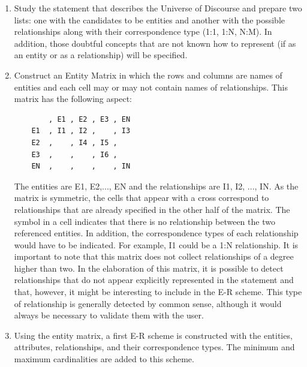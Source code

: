\documentclass{article}
\numberwithin{figure}{section}
\begin{document}
\begin{enumerate}
    \item Study the statement that describes the Universe of Discourse and prepare two lists: one with the candidates to be entities and another with the possible relationships along with their correspondence type (1:1, 1:N, N:M).  In addition, those doubtful concepts that are not known how to represent (if as an entity or as a relationship) will be specified.
    \item Construct an Entity Matrix in which the rows and columns are names of entities and each cell may or may not contain names of relationships.  This matrix has the following aspect:

    \begin{verbatim}
        , E1 , E2 , E3 , EN
    E1  , I1 , I2 ,    , I3
    E2  ,    , I4 , I5 ,
    E3  ,    ,    , I6 ,
    EN  ,    ,    ,    , IN
    \end{verbatim}

    The entities are E1, E2,..., EN and the relationships are I1, I2, ..., IN.  As the matrix is symmetric, the cells that appear with a cross correspond to relationships that are already specified in the other half of the matrix.  The symbol in a cell indicates that there is no relationship between the two referenced entities.  In addition, the correspondence types of each relationship would have to be indicated.  For example, I1 could be a 1:N relationship.  It is important to note that this matrix does not collect relationships of a degree higher than two.  In the elaboration of this matrix, it is possible to detect relationships that do not appear explicitly represented in the statement and that, however, it might be interesting to include in the E-R scheme.  This type of relationship is generally detected by common sense, although it would always be necessary to validate them with the user.

    \item Using the entity matrix, a first E-R scheme is constructed with the entities, attributes, relationships, and their correspondence types.  The minimum and maximum cardinalities are added to this scheme.


\end{enumerate}
\end{document}
